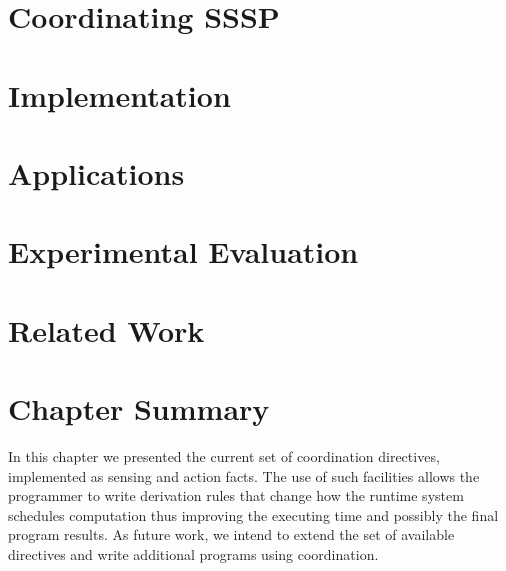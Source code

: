 \section{Coordinating SSSP}


\section{Implementation}


\section{Applications}



\section{Experimental Evaluation}
\section{Related Work}

\section{Chapter Summary}

In this chapter we presented the current set of coordination directives,
implemented as sensing and action facts. The use of such facilities allows the
programmer to write derivation rules that change how the runtime system
schedules computation thus improving the executing time and possibly the final
program results. As future work, we intend to extend the set of available
directives and write additional programs using coordination.

